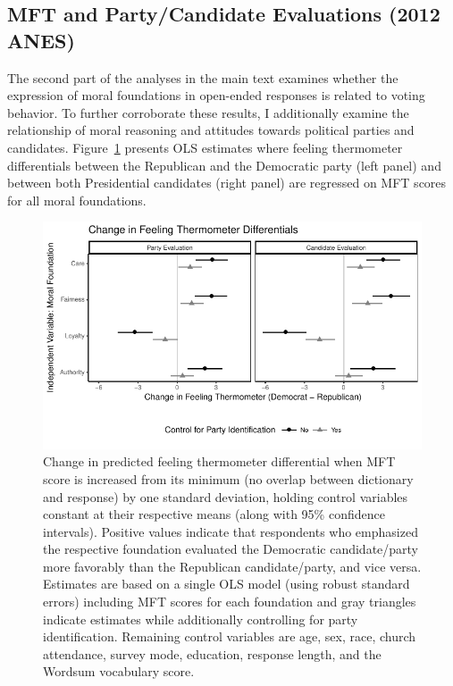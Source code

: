 \documentclass[12pt]{article}
\begin{document}
\clearpage
\subsection{MFT and Party/Candidate Evaluations (2012 ANES)}

The second part of the analyses in the main text examines whether the expression of moral foundations in open-ended responses is related to voting behavior. To further corroborate these results, I additionally examine the relationship of moral reasoning and attitudes towards political parties and candidates. Figure~\ref{fig:ols_feel} presents OLS estimates where feeling thermometer differentials between the Republican and the Democratic party (left panel) and between both Presidential candidates (right panel) are regressed on MFT scores for all moral foundations. 


\begin{figure}[ht]\centering
\includegraphics{../calc/fig/ols_feel.pdf}
\caption{Change in predicted feeling thermometer differential when MFT score is increased from its minimum (no overlap between dictionary and response) by one standard deviation, holding control variables constant at their respective means (along with 95\% confidence intervals). Positive values indicate that respondents who emphasized the respective foundation evaluated the Democratic candidate/party more favorably than the Republican candidate/party, and vice versa. Estimates are based on a single OLS model (using robust standard errors) including MFT scores for each foundation and gray triangles indicate estimates while additionally controlling for party identification. Remaining control variables are age, sex, race, church attendance, survey mode, education, response length, and the Wordsum vocabulary score.
}\label{fig:ols_feel}
\end{figure}
\end{document}
